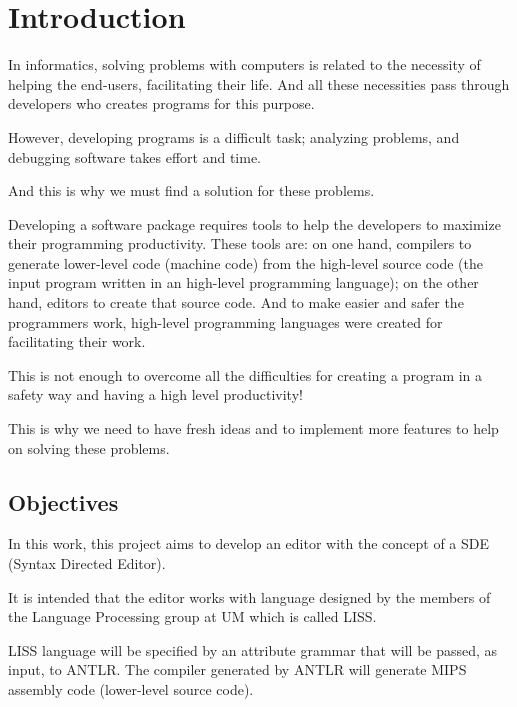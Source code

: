 \documentclass[
  oneside,
  11pt, a4paper,
  footinclude=true,
  headinclude=true,
  cleardoublepage=empty
]{scrbook}
\begin{document}
	\tableofcontents
	\listoffigures
	\listoftables
	\printglossary[type=\acronymtype]
	\clearpage
	\thispagestyle{empty}

	
	
	\chapter{Introduction}
In informatics, solving problems with computers is related to the necessity of helping the end-users, facilitating their life.
And all these necessities pass through developers who creates programs for this purpose.

However, developing programs is a difficult task; analyzing problems, and debugging software takes effort and time.

And this is why we must find a solution for these problems.

Developing a software package  requires tools to help the developers to maximize their programming productivity.
These tools are: on one hand, compilers to generate lower-level code (machine code) from the high-level source code (the input program written in an high-level programming language); on the other hand, editors to create that source code.
And to make easier and safer the programmers work, high-level programming languages were created for facilitating their work.

This is not enough to overcome all the difficulties for creating a program in a safety way and having  a high level productivity!

This is why we need to have fresh ideas and to implement more features to help on solving these problems.

\section{Objectives}
In this work, this project aims to develop an editor with the concept of a SDE (Syntax Directed Editor).

It is intended that the editor works with language designed by the members of the Language Processing group at UM which is called LISS.

LISS language will be specified by an attribute grammar that will be passed, as input, to ANTLR. The compiler generated by ANTLR will generate MIPS assembly code (lower-level source code).
\end{document}
